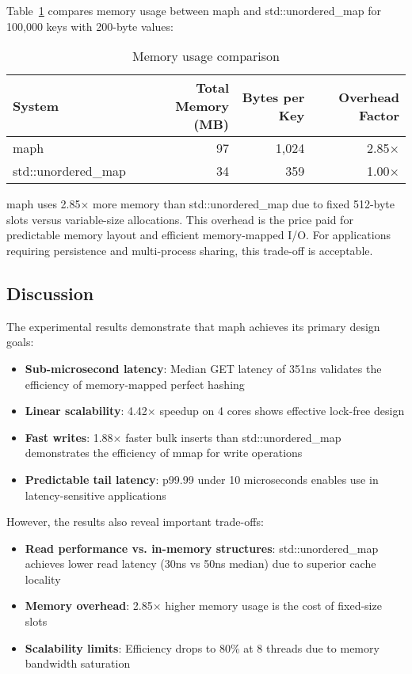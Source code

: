 \documentclass[10pt,conference]{IEEEtran}
\begin{document}
Table~\ref{tab:memory} compares memory usage between maph and std::unordered\_map for 100,000 keys with 200-byte values:

\begin{table}[htbp]
\centering
\caption{Memory usage comparison}
\label{tab:memory}
\begin{tabular}{lrrr}
\toprule
System & Total Memory (MB) & Bytes per Key & Overhead Factor \\
\midrule
maph & 97 & 1,024 & 2.85$\times$ \\
std::unordered\_map & 34 & 359 & 1.00$\times$ \\
\bottomrule
\end{tabular}
\end{table}

maph uses 2.85$\times$ more memory than std::unordered\_map due to fixed 512-byte slots versus variable-size allocations. This overhead is the price paid for predictable memory layout and efficient memory-mapped I/O. For applications requiring persistence and multi-process sharing, this trade-off is acceptable.

\subsection{Discussion}

The experimental results demonstrate that maph achieves its primary design goals:

\begin{itemize}
\item \textbf{Sub-microsecond latency}: Median GET latency of 351ns validates the efficiency of memory-mapped perfect hashing
\item \textbf{Linear scalability}: 4.42$\times$ speedup on 4 cores shows effective lock-free design
\item \textbf{Fast writes}: 1.88$\times$ faster bulk inserts than std::unordered\_map demonstrates the efficiency of mmap for write operations
\item \textbf{Predictable tail latency}: p99.99 under 10 microseconds enables use in latency-sensitive applications
\end{itemize}

However, the results also reveal important trade-offs:

\begin{itemize}
\item \textbf{Read performance vs. in-memory structures}: std::unordered\_map achieves lower read latency (30ns vs 50ns median) due to superior cache locality
\item \textbf{Memory overhead}: 2.85$\times$ higher memory usage is the cost of fixed-size slots
\item \textbf{Scalability limits}: Efficiency drops to 80\% at 8 threads due to memory bandwidth saturation
\end{itemize}
\end{document}
